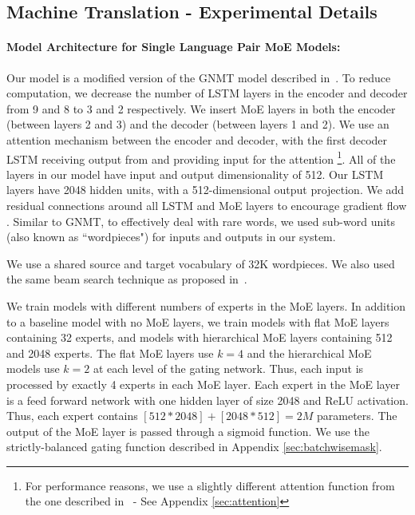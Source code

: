 \documentclass{article} %
\begin{document}
\subsection{Machine Translation - Experimental Details}
\label{sec:appendixmt}


\paragraph{Model Architecture for Single Language Pair MoE Models:} Our model is a modified version of the GNMT model described in~\citep{GNMT}.  To reduce computation, we decrease the number of LSTM layers in the encoder and decoder from 9 and 8 to 3 and 2 respectively.  We insert MoE layers in both the encoder (between layers 2 and 3) and the decoder (between layers 1 and 2). We use an attention mechanism between the encoder and decoder, with the first decoder LSTM receiving output from and providing input for the attention \footnote{For performance reasons, we use a slightly different attention function from the one described in~\citep{GNMT} - See Appendix \ref{sec:attention}}.  All of the layers in our model have input and output dimensionality of 512. Our LSTM layers have 2048 hidden units, with a 512-dimensional output projection.   We add residual connections around all LSTM and MoE layers to encourage gradient flow \citep{HeZRS:2015:DRL}. Similar to GNMT, to effectively deal with rare words, we used sub-word units (also known as ``wordpieces") \citep{Schuster:2012:JKVS} for inputs and outputs in our system. 

We use a shared source and target vocabulary of 32K wordpieces. We also used the same beam search technique as proposed in~\citep{GNMT}. 

We train models with different numbers of experts in the MoE layers.  In addition to a baseline model with no MoE layers, we train models with flat MoE layers containing 32 experts, and models with hierarchical MoE layers containing 512 and 2048 experts.  The flat MoE layers use $k=4$ and the hierarchical MoE models use $k=2$ at each level of the gating network. Thus, each input is processed by exactly 4 experts in each MoE layer.  Each expert in the MoE layer is a feed forward network with one hidden layer of size 2048 and ReLU activation.  Thus, each expert contains $[512 * 2048] + [2048 * 512] = 2M$ parameters.  The output of the MoE layer is passed through a sigmoid function.   We use the strictly-balanced gating function described in Appendix \ref{sec:batchwisemask}.
\end{document}
